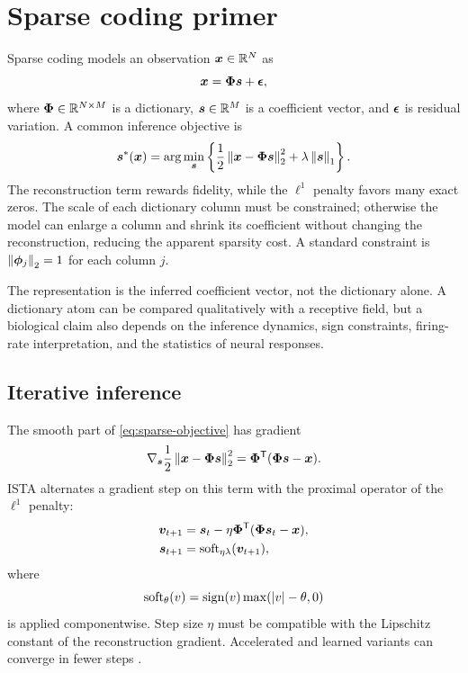 \section{Sparse coding primer}
\label{sec:framework-sparse}

Sparse coding models an observation $\bm{x}\in\mathbb{R}^N$ as
\begin{equation}
\label{eq:sparse-generative}
\bm{x}=\bm{\Phi}\bm{s}+\bm{\epsilon},
\end{equation}
where $\bm{\Phi}\in\mathbb{R}^{N\times M}$ is a dictionary, $\bm{s}\in\mathbb{R}^M$ is a coefficient vector, and $\bm{\epsilon}$ is residual variation. A common inference objective is
\begin{equation}
\label{eq:sparse-objective}
\bm{s}^*(\bm{x})=
\arg\min_{\bm{s}}
\left\{
\frac{1}{2}\left\lVert \bm{x}-\bm{\Phi}\bm{s}\right\rVert_2^2
+\lambda\left\lVert \bm{s}\right\rVert_1
\right\}.
\end{equation}
The reconstruction term rewards fidelity, while the $\ell^1$ penalty favors many exact zeros. The scale of each dictionary column must be constrained; otherwise the model can enlarge a column and shrink its coefficient without changing the reconstruction, reducing the apparent sparsity cost. A standard constraint is $\left\lVert \bm{\phi}_j\right\rVert_2=1$ for each column $j$.

The representation is the inferred coefficient vector, not the dictionary alone. A dictionary atom can be compared qualitatively with a receptive field, but a biological claim also depends on the inference dynamics, sign constraints, firing-rate interpretation, and the statistics of neural responses.

\subsection{Iterative inference}

The smooth part of \cref{eq:sparse-objective} has gradient
\begin{equation}
\nabla_{\bm{s}}\frac{1}{2}\left\lVert \bm{x}-\bm{\Phi}\bm{s}\right\rVert_2^2
=\bm{\Phi}^{\mathsf{T}}(\bm{\Phi}\bm{s}-\bm{x}).
\end{equation}
ISTA alternates a gradient step on this term with the proximal operator of the $\ell^1$ penalty:
\begin{align}
\bm{v}_{t+1}
&=\bm{s}_t-\eta\bm{\Phi}^{\mathsf{T}}(\bm{\Phi}\bm{s}_t-\bm{x}),\\
\bm{s}_{t+1}
&=\operatorname{soft}_{\eta\lambda}(\bm{v}_{t+1}),
\label{eq:ista}
\end{align}
where
\begin{equation}
\operatorname{soft}_{\theta}(v)
=\operatorname{sign}(v)\max(\left\lvert v\right\rvert-\theta,0)
\end{equation}
is applied componentwise. Step size $\eta$ must be compatible with the Lipschitz constant of the reconstruction gradient. Accelerated and learned variants can converge in fewer steps \citep{ba09,gregor10}.

